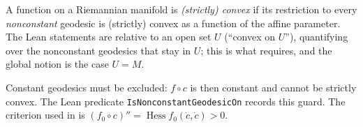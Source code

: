 \begin{definition}
  \label{def:pet-ch6-convex-function}
  \leanok
  A function on a Riemannian manifold is \emph{(strictly) convex} if its
  restriction to every \emph{nonconstant} geodesic is (strictly) convex as a
  function of the affine parameter. The Lean statements are relative to an open
  set $U$ (``convex on $U$''), quantifying over the nonconstant geodesics that
  stay in $U$; this is what 
  requires, and the global notion is the case $U=M$.

  Constant geodesics must be excluded: $f\circ c$ is then constant and cannot
  be strictly convex. The Lean predicate \texttt{IsNonconstantGeodesicOn}
  records this guard. The criterion used in
   is
  $(f_0\circ c)''=\operatorname{Hess}f_0(\dot c,\dot c)>0$.
\end{definition}

